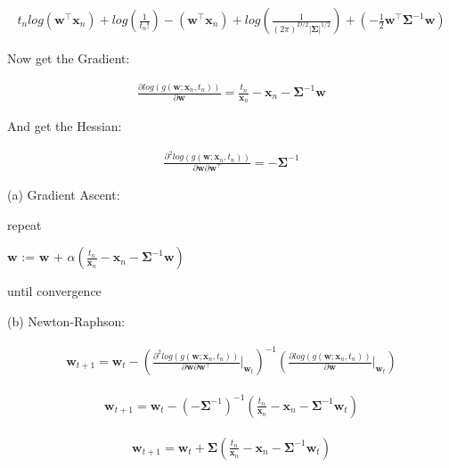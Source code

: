 \documentclass[10pt]{article}
\begin{document}
\begin{itemize}
\begin{align*}
    t_n log(\mathbf{w}^\top\mathbf{x}_n) + log(\frac{1}{t_n!}) -(\mathbf{w}^\top\mathbf{x}_n) + log(\frac{1}{(2 \pi)^{D/2} | \mathbf{\Sigma} |^{1/2}}) + (-\frac{1}{2} \mathbf{w}^\top \mathbf{\Sigma}^{-1} \mathbf{w})
\end{align*}

Now get the Gradient:

\begin{align*}
    \frac{\partial log(g(\mathbf{w};\mathbf{x}_n, t_n))}{\partial \mathbf{w}} =
    \frac{t_n}{\mathbf{x}_n} - \mathbf{x}_n - \mathbf{\Sigma}^{-1} \mathbf{w}
\end{align*}

And get the Hessian:

\begin{align*}
    \frac{\partial^2 log(g(\mathbf{w};\mathbf{x}_n, t_n))}{\partial \mathbf{w} \partial \mathbf{w}^{\top}} = 
    - \mathbf{\Sigma}^{-1}
\end{align*}

(a) Gradient Ascent:


repeat 

$\mathbf{w}$ := $\mathbf{w}$ + $\alpha (\frac{t_n}{\mathbf{x}_n} - \mathbf{x}_n - \mathbf{\Sigma}^{-1} \mathbf{w})$
    
until convergence


(b) Newton-Raphson:

\begin{align*}
    \mathbf{w}_{t+1} = \mathbf{w}_t - (\frac{\partial^2 log(g(\mathbf{w};\mathbf{x}_n, t_n))}{\partial \mathbf{w} \partial \mathbf{w}^{\top}} |_{\mathbf{w}_t})^{-1} (\frac{\partial log(g(\mathbf{w};\mathbf{x}_n, t_n))}{\partial \mathbf{w}} |_{\mathbf{w}_t})
\end{align*}

\begin{align*}
    \mathbf{w}_{t+1} = \mathbf{w}_t - (- \mathbf{\Sigma}^{-1})^{-1} (\frac{t_n}{\mathbf{x}_n} - \mathbf{x}_n - \mathbf{\Sigma}^{-1} \mathbf{w}_t)
\end{align*}

\begin{align*}
    \mathbf{w}_{t+1} = \mathbf{w}_t + \mathbf{\Sigma} (\frac{t_n}{\mathbf{x}_n} - \mathbf{x}_n - \mathbf{\Sigma}^{-1} \mathbf{w}_t)
\end{align*}

\end{itemize}
\end{document}
